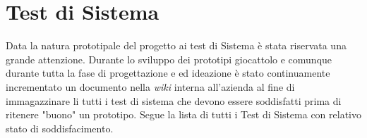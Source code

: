 
\chapter{Test di Sistema}
\label{cap:verifica-validazione}

Data la natura prototipale del progetto ai test di Sistema è stata riservata una grande attenzione. Durante lo sviluppo dei prototipi giocattolo e comunque durante tutta la fase di progettazione e ed ideazione è stato continuamente incrementato un documento nella \emph{wiki} interna all'azienda al fine di immagazzinare li tutti i test di sistema che devono essere soddisfatti prima di ritenere "buono" un prototipo.
Segue la lista di tutti i Test di Sistema con relativo stato di soddisfacimento.
